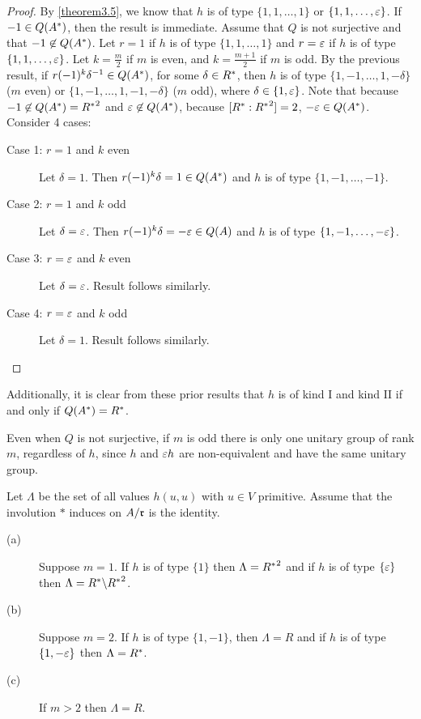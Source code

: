 \begin{proof}
By \cref{theorem3.5}, we know that $h$ is of type $\{1, 1, \dotsc, 1\}$ or $\{1, 1, \dotsc, \varepsilon \}$.
If $-1 \in Q(A^*)$, then the result is immediate.
Assume that $Q$ is not surjective and that $-1 \not\in Q(A^*)$.
Let $r = 1$ if $h$ is of type $\{1, 1, \dotsc, 1\}$ and $r = \varepsilon$ if $h$ is of type $\{1, 1, \dotsc, \varepsilon\}$.
Let $k = \frac{m}{2}$ if $m$ is even, and $k = \frac{m+1}{2}$ if $m$ is odd.
By the previous result, if $r (-1)^k \delta ^{-1} \in Q(A^*)$, for some $\delta \in R^*$, then $h$ is of type $\{1, -1, \dotsc, 1, -\delta\}$ ($m$ even) or $\{1, -1, \dotsc, 1, -1, -\delta \}$ ($m$ odd), where $\delta \in \{1, \varepsilon\}$.
Note that because $-1 \not\in Q(A^*) = {R^*}^2$ and $\varepsilon \not \in Q(A^*)$, because $[R^* : {R^*}^2] = 2$, $-\varepsilon \in Q(A^*)$.
Consider 4 cases:
\begin{description}
\item[Case 1: $r = 1$ and $k$ even] Let $\delta = 1$. Then $r (-1)^k \delta = 1 \in Q(A^*)$ and $h$ is of type $\{1, -1, \dotsc, -1 \}$.
\item[Case 2: $r = 1$ and $k$ odd] Let $\delta = \varepsilon$. Then $r (-1)^k \delta = -\varepsilon \in Q(A)$ and $h$ is of type $\{1, -1, \dotsc, -\varepsilon \}$.
\item[Case 3: $r = \varepsilon$ and $k$ even] Let $\delta = \varepsilon$. Result follows similarly.
\item[Case 4: $r = \varepsilon$ and $k$ odd] Let $\delta = 1$. Result follows similarly.
\end{description}
\end{proof}
Additionally, it is clear from these prior results that $h$ is of kind I and kind II if and only if $Q(A^*) = R^*$.

Even when $Q$ is not surjective, if $m$ is odd there is only one unitary group of rank $m$, regardless of $h$, since $h$ and $\varepsilon h$ are non-equivalent and have the same unitary group.

\begin{lemma}\label{lemma3.7}
Let $\Lambda$ be the set of all values $h(u,u)$ with $u \in V$ primitive.
Assume that the involution $*$ induces on $A/\mathfrak{r}$ is the identity.
\begin{description}
\item[(a)] Suppose $m=1$. If $h$ is of type $\{1\}$ then $\Lambda = {R^*}^2$ and if $h$ is of type $\{\varepsilon\}$ then $\Lambda = R^* \backslash {R^*}^2$.
\item[(b)] Suppose $m=2$. If $h$ is of type $\{1, -1\}$, then $\Lambda = R$ and if $h$ is of type $\{1, - \varepsilon\}$ then $\Lambda = R^*$.
\item[(c)] If $m > 2$ then $\Lambda = R$.
\end{description}
\end{lemma}

